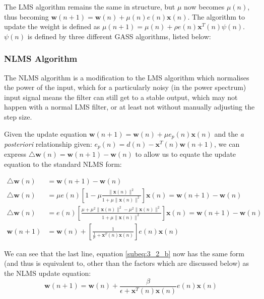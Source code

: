 \documentclass[./main.tex]{subfiles}
\begin{document}
The LMS algorithm remains the same in structure, but $\mu$ now becomes $\mu(n)$, thus becoming $  \mathbf{w}(n+1) = \mathbf{w}(n) + \mu(n) e(n) \mathbf{x}(n) $. The algorithm to update the weight is defined as $ \mu(n+1) = \mu(n) + \rho e(n) \mathbf{x}^T(n) \psi(n)$. $ \psi(n) $ is defined by three different GASS algorithms, listed below:




\subsubsection{NLMS Algorithm}

The NLMS algorithm is a modification to the LMS algorithm which normalises the power of the input, which for a particularly noisy (in the power spectrum) input signal means the filter can still get to a stable output, which may not happen with a normal LMS filter, or at least not without manually adjusting the step size.

Given the update equation $ \mathbf{w}(n+1) = \mathbf{w}(n) + \mu e_p(n) \mathbf{x}(n) $ and the \textit{a posteriori} relationship given: $  e_p(n) = d(n) - \mathbf{x}^T(n) \mathbf{w}(n+1) $, we can express $ \bigtriangleup \mathbf{w}(n) = \mathbf{w}(n+1) - \mathbf{w}(n) $ to allow us to equate the update equation to the standard NLMS form:

\begin{subequations}
	\begin{align}
	\bigtriangleup \mathbf{w}(n) &= \mathbf{w}(n+1) - \mathbf{w}(n) \\
	\bigtriangleup \mathbf{w}(n) &= \mu e(n) \left[  1 - \mu \frac{\lVert \mathbf{x}(n)\rVert^2}{1 + \mu \lVert \mathbf{x}(n)\rVert^2} \right] \mathbf{x}(n) = \mathbf{w}(n+1) - \mathbf{w}(n) \\
	\bigtriangleup \mathbf{w}(n) &= e(n) \left[ \frac{\mu + \mu^2  \lVert \mathbf{x}(n)\rVert^2 - \mu^2 \lVert \mathbf{x}(n)\rVert^2}{1 + \mu \lVert \mathbf{x}(n)\rVert^2} \right] \mathbf{x}(n) = \mathbf{w}(n+1) - \mathbf{w}(n) \\
	\mathbf{w}(n+1) &= \mathbf{w}(n) + \left[ \frac{1}{\frac{1}{\mu} + \mathbf{x}^T(n)\mathbf{x}(n) } \right] e(n) \mathbf{x}(n)  \label{subeq:3_2_b}
	\end{align}
\end{subequations}

We can see that the last line, equation \ref{subeq:3_2_b} now has the same form (and thus is equivalent to, other than the factors which are discussed below) as the NLMS update equation:
$$ \mathbf{w}(n+1) = \mathbf{w}(n) + \frac{\beta}{\epsilon + \mathbf{x}^T(n)\mathbf{x}(n)} e(n) \mathbf{x}(n) $$
\end{document}

